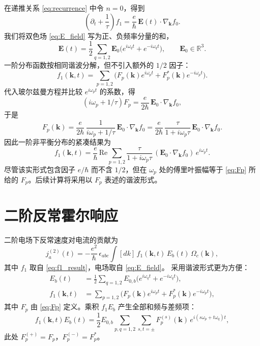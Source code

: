 在递推关系 \eqref{eq:recurrence} 中令 \(n=0\)，得到
\[
\left(\partial_t + \frac{1}{\tau}\right) f_1 = \frac{e}{\hbar}\,\mathbf{E}(t)\cdot\nabla_\mathbf{k} f_0.
\]
我们将双色场 \eqref{eq:E_field} 写为正、负频率分量的和，
\begin{equation}
\mathbf{E}(t) = \frac12 \sum_{q=1,2} \mathbf{E}_0 \big(e^{i\omega_q t} + e^{-i\omega_q t}\big),
\qquad \mathbf{E}_0\in\mathbb{R}^3.
\end{equation}
一阶分布函数按相同谐波分解，但不引入额外的 \(1/2\) 因子：
\begin{equation}
f_1(\mathbf{k},t) = \sum_{p=1,2} \big( F_p(\mathbf{k}) e^{i\omega_p t} + F_p^*(\mathbf{k}) e^{-i\omega_p t} \big).
\end{equation}
代入玻尔兹曼方程并比较 \(e^{i\omega_p t}\) 的系数，得
\begin{equation}
(i\omega_p + 1/\tau) F_p = \frac{e}{2\hbar}\, \mathbf{E}_0\!\cdot\!\nabla_\mathbf{k} f_0,
\end{equation}
于是
\begin{equation}
F_p(\mathbf{k}) = \frac{e}{2\hbar}\,\frac{1}{i\omega_p + 1/\tau}\, \mathbf{E}_0\!\cdot\!\nabla_\mathbf{k} f_0
= \frac{e}{2\hbar}\,\frac{\tau}{1+i\omega_p\tau}\, \mathbf{E}_0\!\cdot\!\nabla_\mathbf{k} f_0.
\label{eq:Fp}
\end{equation}
因此一阶非平衡分布的紧凑结果为
\begin{equation}
{ f_1(\mathbf{k},t) = \frac{e}{\hbar}\,\mathrm{Re}\!\sum_{p=1,2} \frac{\tau}{1+i\omega_p\tau}\,(\mathbf{E}_0\!\cdot\!\nabla_\mathbf{k} f_0)\,e^{i\omega_p t} }.
\label{eq:f1_result}
\end{equation}
尽管该实形式包含因子 \(e/\hbar\) 而不含 \(1/2\)，但在 \(\omega_p\) 处的傅里叶振幅等于 \eqref{eq:Fp} 所给的 \(F_p\)。后续计算将采用以 \(F_p\) 表述的谐波形式。

\section{二阶反常霍尔响应}

二阶电场下反常速度对电流的贡献为
\begin{equation}
j^{(2)}_a(t) = -\frac{e^2}{\hbar}\,\epsilon_{abc} \int [dk]\, f_1(\mathbf{k},t)\,E_b(t)\,\Omega_c(\mathbf{k}),
\label{eq:j2_anom}
\end{equation}
其中 \(f_1\) 取自 \eqref{eq:f1_result}，电场取自 \eqref{eq:E_field}。
采用谐波形式更为方便：
\begin{align}
E_b(t) &= \frac12 \sum_{q=1,2} E_{0,b}\big(e^{i\omega_q t} + e^{-i\omega_q t}\big), \\[2pt]
f_1(\mathbf{k},t) &= \sum_{p=1,2} \big( F_p(\mathbf{k}) e^{i\omega_p t} + F^*_p(\mathbf{k}) e^{-i\omega_p t} \big),
\end{align}
其中 \(F_p\) 由 \eqref{eq:Fp} 定义。乘积 \(f_1E_b\) 产生全部和频与差频项：
\begin{equation}
f_1(\mathbf{k},t)E_b(t) = \frac12 E_{0,b} \sum_{p,q=1,2} \sum_{s,t=\pm} F_p^{(s)}(\mathbf{k})\, e^{i(s\omega_p + t\omega_q)t},
\label{eq:f1E_product}
\end{equation}
此处 \(F_p^{(+)}=F_p\)，\(F_p^{(-)}=F_p^*\)。

